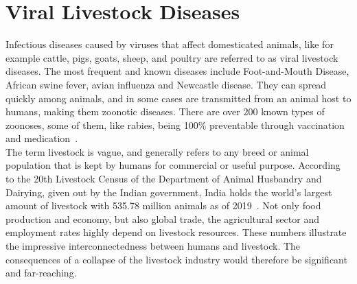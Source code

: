 \section{Viral Livestock Diseases}\label{sec:viral} 
Infectious diseases caused by viruses that affect domesticated animals, like for example cattle, pigs, goats, sheep, and poultry are referred to as viral livestock diseases. The most frequent and known diseases include Foot-and-Mouth Disease, African swine fever, avian influenza and Newcastle disease. They can spread quickly among animals, and in some cases are transmitted from an animal host to humans, making them zoonotic diseases. There are over 200 known types of zoonoses, some of them, like rabies, being 100\% preventable through vaccination and medication~\cite{who2020zoon}.\\
The term livestock is vague, and generally refers to any breed or animal population that is kept by humans for commercial or useful purpose. According to the 20th Livestock Census of the Department of Animal Husbandry and Dairying, given out by the Indian government, India holds the world's largest amount of livestock with 535.78 million animals as of 2019~\cite{livestock2019}. Not only food production and economy, but also global trade, the agricultural sector and employment rates highly depend on livestock resources. These numbers illustrate the impressive interconnectedness between humans and livestock. The consequences of a collapse of the livestock industry would therefore be significant and far-reaching. 


